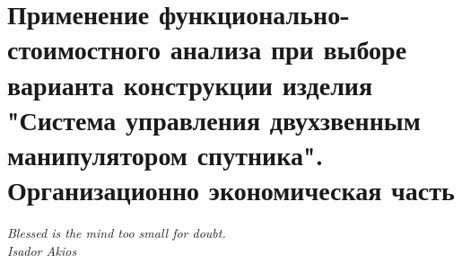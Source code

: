 \documentclass{article}
\begin{document}
\tableofcontents
\newpage
\part{
    Применение функционально-стоимостного
    анализа при выборе варианта конструкции
    изделия "Система управления двухзвенным манипулятором спутника".
    Организационно экономическая часть
}
\begin{flushright}
    \itshape
    Blessed is the mind too small for doubt.\\
    Isador Akios
\end{flushright}



\newpage
\section[Список использованной литературы]{}
\begin{thebibliography}{30}
    
\end{thebibliography}
\end{document}
